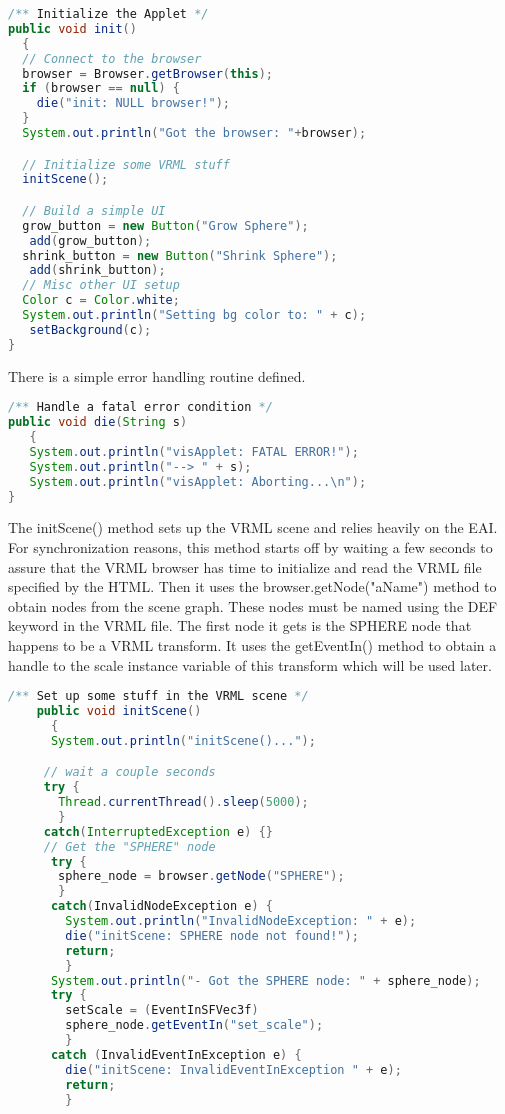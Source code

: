 \begin{lstlisting}[language=Java, caption={}, numbers=none, frame=none]
/** Initialize the Applet */
public void init()
  {
  // Connect to the browser
  browser = Browser.getBrowser(this);
  if (browser == null) {
    die("init: NULL browser!");
  }
  System.out.println("Got the browser: "+browser);

  // Initialize some VRML stuff
  initScene();

  // Build a simple UI
  grow_button = new Button("Grow Sphere");
   add(grow_button);
  shrink_button = new Button("Shrink Sphere");
   add(shrink_button);
  // Misc other UI setup
  Color c = Color.white;
  System.out.println("Setting bg color to: " + c);
   setBackground(c);
}
\end{lstlisting}

There is a simple error handling routine defined.

\begin{lstlisting}[language=Java, caption={}, numbers=none, frame=none]
/** Handle a fatal error condition */
public void die(String s)
   {
   System.out.println("visApplet: FATAL ERROR!");
   System.out.println("--> " + s);
   System.out.println("visApplet: Aborting...\n");
}
\end{lstlisting}

The initScene() method sets up the VRML scene and relies heavily on the EAI. For synchronization reasons, this method starts off by waiting a few seconds to assure that the VRML browser has time to initialize and read the VRML file specified by the HTML. Then it uses the browser.getNode("aName") method to obtain nodes from the scene graph. These nodes must be named using the DEF keyword in the VRML file. The first node it gets is the SPHERE node that happens to be a VRML transform. It uses the getEventIn() method to obtain a handle to the scale instance variable of this transform which will be used later.

\begin{lstlisting}[language=Java, caption={}, numbers=none, frame=none]
/** Set up some stuff in the VRML scene */
    public void initScene()
      {
      System.out.println("initScene()...");

     // wait a couple seconds
     try {
       Thread.currentThread().sleep(5000);
       }
     catch(InterruptedException e) {}
     // Get the "SPHERE" node
      try {
       sphere_node = browser.getNode("SPHERE");
       }
      catch(InvalidNodeException e) {
        System.out.println("InvalidNodeException: " + e);
        die("initScene: SPHERE node not found!");
        return;
        }
      System.out.println("- Got the SPHERE node: " + sphere_node);
      try {
        setScale = (EventInSFVec3f)
        sphere_node.getEventIn("set_scale");
        }
      catch (InvalidEventInException e) {
        die("initScene: InvalidEventInException " + e);
        return;
        }
\end{lstlisting}

